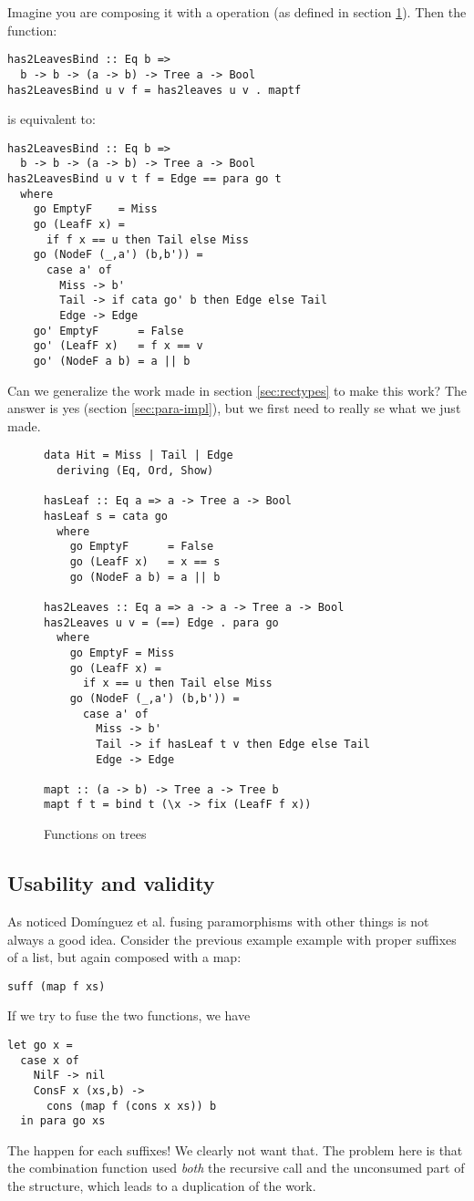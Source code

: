 Imagine you are composing it with a  operation (as defined in section \ref{fig:has2Leaves}). Then
the function:
\begin{verbatim}
has2LeavesBind :: Eq b =>
  b -> b -> (a -> b) -> Tree a -> Bool
has2LeavesBind u v f = has2leaves u v . maptf
\end{verbatim}
\noindent is equivalent to:
\begin{verbatim}
has2LeavesBind :: Eq b =>
  b -> b -> (a -> b) -> Tree a -> Bool
has2LeavesBind u v t f = Edge == para go t
  where
    go EmptyF    = Miss
    go (LeafF x) =
      if f x == u then Tail else Miss
    go (NodeF (_,a') (b,b')) =
      case a' of
        Miss -> b'
        Tail -> if cata go' b then Edge else Tail
        Edge -> Edge
    go' EmptyF      = False
    go' (LeafF x)   = f x == v
    go' (NodeF a b) = a || b
\end{verbatim}

Can we generalize the work made in section \ref{sec:rectypes} to make this work? The answer is yes (section \ref{sec:para-impl}), but we first need to really se what we just made.

\begin{figure}
\begin{verbatim}
data Hit = Miss | Tail | Edge
  deriving (Eq, Ord, Show)

hasLeaf :: Eq a => a -> Tree a -> Bool
hasLeaf s = cata go
  where
    go EmptyF      = False
    go (LeafF x)   = x == s
    go (NodeF a b) = a || b

has2Leaves :: Eq a => a -> a -> Tree a -> Bool
has2Leaves u v = (==) Edge . para go
  where
    go EmptyF = Miss
    go (LeafF x) =
      if x == u then Tail else Miss
    go (NodeF (_,a') (b,b')) =
      case a' of
        Miss -> b'
        Tail -> if hasLeaf t v then Edge else Tail
        Edge -> Edge

mapt :: (a -> b) -> Tree a -> Tree b
mapt f t = bind t (\x -> fix (LeafF f x))
\end{verbatim}
\caption{Functions on trees}
\label{fig:has2Leaves}
\end{figure}

\subsection{Usability and validity}
As noticed Domínguez et al. \cite{paramorphismFusion} fusing paramorphisms with other things is not always a good idea. Consider the previous example example with proper suffixes of a list, but again composed with a map:
\begin{verbatim}
suff (map f xs)
\end{verbatim}
\noindent If we try to fuse the two functions, we have
\begin{verbatim}
let go x =
  case x of
    NilF -> nil
    ConsF x (xs,b) -> 
      cons (map f (cons x xs)) b
  in para go xs
\end{verbatim}
\noindent The  happen for each suffixes! We clearly not want that.
The problem here is that the combination function used \emph{both} the recursive call and the unconsumed part of the structure, which leads to a duplication of the work.

